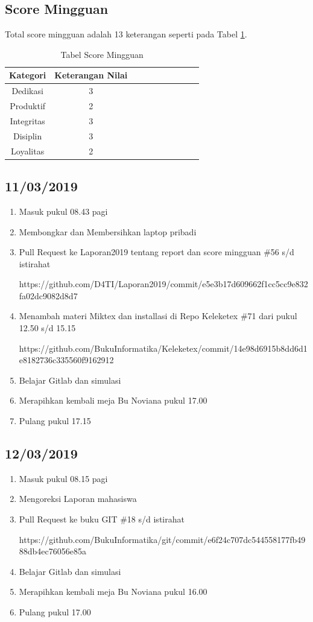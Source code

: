 \subsection{Score Mingguan}
Total score mingguan adalah 13 keterangan seperti pada Tabel \ref{table:scoremingguan1}.
\begin{table}[!ht]
\centering
\begin{tabular}{ |c|c|c|c|c|c|c|c|c|c| }
\hline
Kategori & Keterangan Nilai \\
\hline
Dedikasi & 3 \\
\hline
Produktif & 2 \\
\hline
Integritas & 3 \\
\hline
Disiplin & 3 \\
\hline
Loyalitas & 2 \\
\hline
\end{tabular}
\caption{Tabel Score Mingguan}
\label{table:scoremingguan1}
\end{table}

\subsection{11/03/2019}
\begin{enumerate}
  \item Masuk pukul 08.43 pagi
  \item Membongkar dan Membersihkan laptop pribadi
  \item Pull Request ke Laporan2019 tentang report dan score mingguan \#56 s/d istirahat
\par https://github.com/D4TI/Laporan2019/commit/e5e3b17d609662f1cc5cc9e832fa02dc9082d8d7
  \item Menambah materi Miktex dan installasi di Repo Keleketex \#71 dari pukul 12.50 s/d 15.15
\par https://github.com/BukuInformatika/Keleketex/commit/14e98d6915b8dd6d1e8182736c335560f9162912
  \item Belajar Gitlab dan simulasi
  \item Merapihkan kembali meja Bu Noviana pukul 17.00
  \item Pulang pukul 17.15
\end{enumerate}

\subsection{12/03/2019}
\begin{enumerate}
  \item Masuk pukul 08.15 pagi
  \item Mengoreksi Laporan mahasiswa
  \item Pull Request ke buku GIT  \#18 s/d istirahat
\par https://github.com/BukuInformatika/git/commit/e6f24c707dc544558177fb4988db4ec76056e85a
  \item Belajar Gitlab dan simulasi
  \item Merapihkan kembali meja Bu Noviana pukul 16.00
  \item Pulang pukul 17.00
\end{enumerate}

